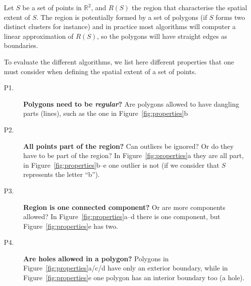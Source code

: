 Let $S$ be a set of points in $\mathbb{R}^2$, and $R(S)$ the region that characterise the spatial extent of $S$.
The region is potentially formed by a set of polygons (if $S$ forms two distinct clusters for instance) and in practice most algorithms will computer a linear approximation of $R(S)$, so the polygons will have straight edges as boundaries.

To evaluate the different algorithms, we list here different properties that one must consider when defining the spatial extent of a set of points.
\begin{description}
  \item[P1.] \textbf{Polygons need to be \emph{regular}?} Are polygons allowed to have dangling parts (lines), such as the one in Figure~\ref{fig:properties}b
  \item[P2.] \textbf{All points part of the region?} Can outliers be ignored? Or do they have to be part of the region? In Figure~\ref{fig:properties}a they are all part, in Figure~\ref{fig:properties}b--e one outlier is not (if we consider that $S$ represents the letter ``b'').
  \item[P3.] \textbf{Region is one connected component?} Or are more components allowed? In Figure~\ref{fig:properties}a--d there is one component, but Figure~\ref{fig:properties}e has two.
  \item[P4.] \textbf{Are holes allowed in a polygon?} Polygons in Figure~\ref{fig:properties}a/c/d have only an exterior boundary, while in Figure~\ref{fig:properties}e one polygon has an interior boundary too (a hole).
\end{description}
